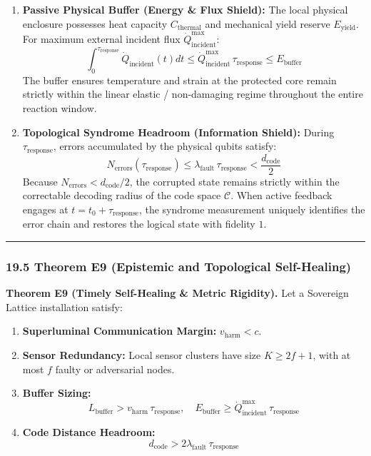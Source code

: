 \documentclass[
]{article}
\providecommand{\tightlist}{%
  \setlength{\itemsep}{0pt}\setlength{\parskip}{0pt}}
\begin{document}
\begin{enumerate}
\def\labelenumi{\arabic{enumi}.}
\tightlist
\item
  \textbf{Passive Physical Buffer (Energy \& Flux Shield):} The local
  physical enclosure possesses heat capacity \(C_{\mathrm{thermal}}\)
  and mechanical yield reserve \(E_{\mathrm{yield}}\). For maximum
  external incident flux \(\dot Q_{\mathrm{incident}}^{\max}\):
  \[\int_0^{\tau_{\mathrm{response}}} \dot Q_{\mathrm{incident}}(t) dt \le \dot Q_{\mathrm{incident}}^{\max} \, \tau_{\mathrm{response}} \le E_{\mathrm{buffer}}\]
  The buffer ensures temperature and strain at the protected core remain
  strictly within the linear elastic / non-damaging regime throughout
  the entire reaction window.
\item
  \textbf{Topological Syndrome Headroom (Information Shield):} During
  \(\tau_{\mathrm{response}}\), errors accumulated by the physical
  qubits satisfy:
  \[N_{\mathrm{errors}}(\tau_{\mathrm{response}}) \le \lambda_{\mathrm{fault}} \, \tau_{\mathrm{response}} < \frac{d_{\mathrm{code}}}{2}\]
  Because \(N_{\mathrm{errors}} < d_{\mathrm{code}}/2\), the corrupted
  state remains strictly within the correctable decoding radius of the
  code space \(\mathcal{C}\). When active feedback engages at
  \(t = t_0 + \tau_{\mathrm{response}}\), the syndrome measurement
  uniquely identifies the error chain and restores the logical state
  with fidelity \(1\).
\end{enumerate}

\begin{center}\rule{0.5\linewidth}{0.5pt}\end{center}

\subsubsection{19.5 Theorem E9 (Epistemic and Topological
Self-Healing)}\label{theorem-e9-epistemic-and-topological-self-healing}

\textbf{Theorem E9 (Timely Self-Healing \& Metric Rigidity).} Let a
Sovereign Lattice installation satisfy:

\begin{enumerate}
\def\labelenumi{\arabic{enumi}.}
\tightlist
\item
  \textbf{Superluminal Communication Margin:} \(v_{\mathrm{harm}} < c\).
\item
  \textbf{Sensor Redundancy:} Local sensor clusters have size
  \(K \ge 2f + 1\), with at most \(f\) faulty or adversarial nodes.
\item
  \textbf{Buffer Sizing:}
  \[L_{\mathrm{buffer}} > v_{\mathrm{harm}} \, \tau_{\mathrm{response}}, \quad E_{\mathrm{buffer}} \ge \dot Q_{\mathrm{incident}}^{\max} \, \tau_{\mathrm{response}}\]
\item
  \textbf{Code Distance Headroom:}
  \[d_{\mathrm{code}} > 2 \lambda_{\mathrm{fault}} \, \tau_{\mathrm{response}}\]
\end{enumerate}
\end{document}
